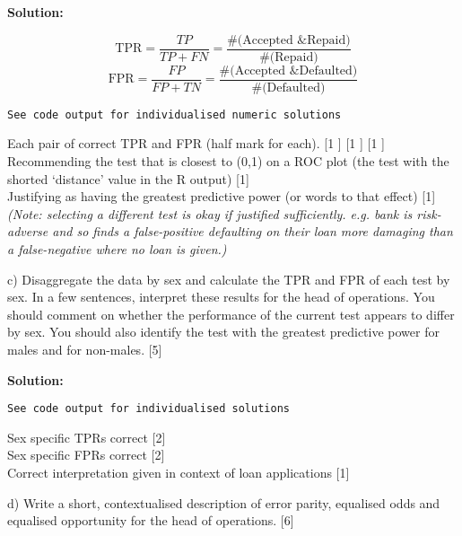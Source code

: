 \documentclass[a4paper, 11pt]{article}
\begin{document}
{\color{blue}
\textbf{Solution:} 

$$\text{TPR} = \frac{TP}{TP + FN} = \frac{\text{\#(Accepted \& Repaid)}}{\text{\#(Repaid)}}$$
$$\text{FPR} = \frac{FP}{FP + TN} = \frac{\text{\#(Accepted \& Defaulted)}}{\text{\#(Defaulted)}}$$

\texttt{See code output for individualised numeric solutions}

Each pair of correct TPR and FPR (half mark for each). [1 ] [1 ] [1 ] \\
Recommending the test that is closest to (0,1) on a ROC plot (the test with the shorted `distance' value in the R output) [1] \\
Justifying as having the greatest predictive power (or words to that effect) [1] \\ 

\textit{(Note: selecting a different test is okay if justified sufficiently. e.g. bank is risk-adverse and so finds a false-positive defaulting on their loan more damaging than a false-negative where no loan is given.)}
}

c) Disaggregate the data by sex and calculate the TPR and FPR of each test by sex. In a few sentences, interpret these results for the head of operations. You should comment on whether the performance of the current test appears to differ by sex. You should also identify the test with the greatest predictive power for males and for non-males.  [5]

{\color{blue}
\textbf{Solution:} 

\texttt{See code output for individualised solutions}

Sex specific TPRs correct [2] \\
Sex specific FPRs correct [2] \\
Correct interpretation given in context of loan applications [1]
}

d) Write a short, contextualised description of error parity, equalised odds and equalised opportunity for the head of operations. [6]
\end{document}
